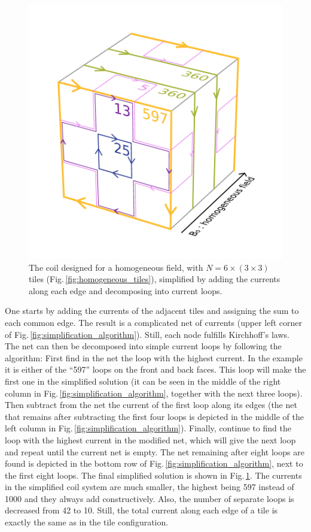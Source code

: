 \begin{figure}
  \centering
  \includegraphics[width=\linewidth]{gfx/coils/algorithm_simplified_5.pdf}
  \caption{The coil designed for a homogeneous field, with $N = 6 \times (3 \times 3)$ tiles (Fig.\,\ref{fig:homogeneous_tiles}), simplified by adding the currents along each edge and decomposing into current loops.}\label{fig:homogeneous_coils}
\end{figure}

One starts by adding the currents of the adjacent tiles and assigning the sum to each common edge. The result is a complicated net of currents (upper left corner of Fig.\,\ref{fig:simplification_algorithm}). Still, each node fulfills Kirchhoff's laws. The net can then be decomposed into simple current loops by following the algorithm: First find in the net the loop with the highest current. In the example it is either of the ``\num{597}'' loops on the front and back faces. This loop will make the first one in the simplified solution (it can be seen in the middle of the right column in Fig.\,\ref{fig:simplification_algorithm}, together with the next three loops). Then subtract from the net the current of the first loop along its edges (the net that remains after subtracting the first four loops is depicted in the middle of the left column in Fig.\,\ref{fig:simplification_algorithm}). Finally, continue to find the loop with the highest current in the modified net, which will give the next loop and repeat until the current net is empty. The net remaining after eight loops are found is depicted in the bottom row of Fig.\,\ref{fig:simplification_algorithm}, next to the first eight loops. The final simplified solution is shown in Fig.\,\ref{fig:homogeneous_coils}. The currents in the simplified coil system are much smaller, the highest being \num{597} instead of \num{1000} and they always add constructively. Also, the number of separate loops is decreased from \num{42} to \num{10}. Still, the total current along each edge of a tile is exactly the same as in the tile configuration.

